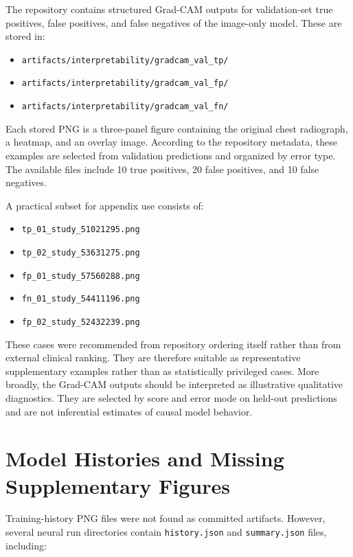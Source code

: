 The repository contains structured Grad-CAM outputs for validation-set true positives, false positives, and false negatives of the image-only model. These are stored in:

\begin{itemize}
    \item \texttt{artifacts/interpretability/gradcam\_val\_tp/}
    \item \texttt{artifacts/interpretability/gradcam\_val\_fp/}
    \item \texttt{artifacts/interpretability/gradcam\_val\_fn/}
\end{itemize}

Each stored PNG is a three-panel figure containing the original chest radiograph, a heatmap, and an overlay image. According to the repository metadata, these examples are selected from validation predictions and organized by error type. The available files include 10 true positives, 20 false positives, and 10 false negatives.

A practical subset for appendix use consists of:
\begin{itemize}
    \item \texttt{tp\_01\_study\_51021295.png}
    \item \texttt{tp\_02\_study\_53631275.png}
    \item \texttt{fp\_01\_study\_57560288.png}
    \item \texttt{fn\_01\_study\_54411196.png}
    \item \texttt{fp\_02\_study\_52432239.png}
\end{itemize}

These cases were recommended from repository ordering itself rather than from external clinical ranking. They are therefore suitable as representative supplementary examples rather than as statistically privileged cases. More broadly, the Grad-CAM outputs should be interpreted as illustrative qualitative diagnostics. They are selected by score and error mode on held-out predictions and are not inferential estimates of causal model behavior.

\section{Model Histories and Missing Supplementary Figures}

Training-history PNG files were not found as committed artifacts. However, several neural run directories contain \texttt{history.json} and \texttt{summary.json} files, including:

